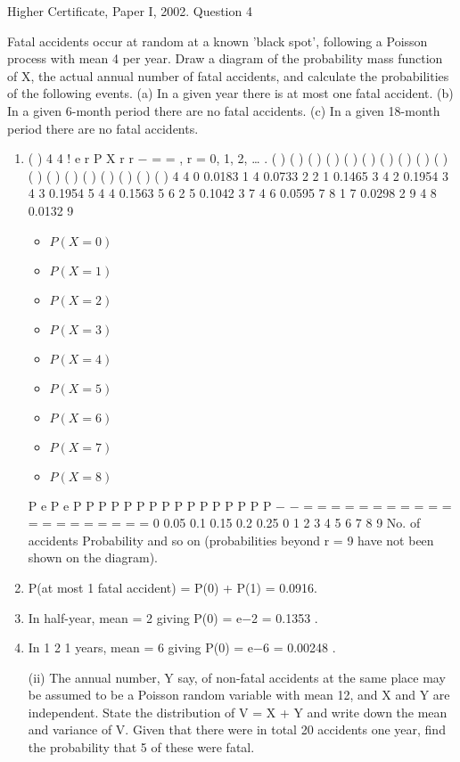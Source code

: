 \documentclass[a4paper,12pt]{article}
\begin{document}
Higher Certificate, Paper I, 2002. Question 4
\begin{framed}

\noindent Fatal accidents occur at random at a known 'black spot', following a
Poisson process with mean 4 per year. Draw a diagram of the probability
mass function of X, the actual annual number of fatal accidents, and
calculate the probabilities of the following events.
(a) In a given year there is at most one fatal accident.
(b) In a given 6-month period there are no fatal accidents.
(c) In a given 18-month period there are no fatal accidents.
\end{framed}

\begin{enumerate}
\item ( )
4 4
!
e r P X r
r
−
= = , r = 0, 1, 2, … .
( )
( )
( ) ( )
( ) ( )
( ) ( )
( ) ( )
( ) ( )
( ) ( )
( ) ( )
( ) ( )
4
4
0 0.0183
1 4 0.0733
2 2 1 0.1465
3 4 2 0.1954
3
4 3 0.1954
5 4 4 0.1563
5
6 2 5 0.1042
3
7 4 6 0.0595
7
8 1 7 0.0298
2
9 4 8 0.0132
9

\begin{itemize}
    \item $P(X=0)$
    \item $P(X=1)$
    \item $P(X=2)$
    \item $P(X=3)$
    \item $P(X=4)$
    \item $P(X=5)$
    \item $P(X=6)$
    \item $P(X=7)$
    \item $P(X=8)$
\end{itemize}

P e
P e
P P
P P
P P
P P
P P
P P
P P
P P
−
−
= =
= =
= =
= =
= =
= =
= =
= =
= =
= =
0
0.05
0.1
0.15
0.2
0.25
0 1 2 3 4 5 6 7 8 9
No. of accidents
Probability
and so on (probabilities beyond r = 9 have not been shown on the diagram).
\item P(at most 1 fatal accident) = P(0) + P(1) = 0.0916.
\item In half-year, mean = 2 giving P(0) = e−2 = 0.1353 .
\item In 1
2 1 years, mean = 6 giving P(0) = e−6 = 0.00248 .

\newpage
\begin{framed}
(ii) The annual number, Y say, of non-fatal accidents at the same place may be
assumed to be a Poisson random variable with mean 12, and X and Y are
independent. State the distribution of V = X + Y and write down the mean
and variance of V. Given that there were in total 20 accidents one year,
find the probability that 5 of these were fatal.
\end{framed}


\end{enumerate}
\end{document}
